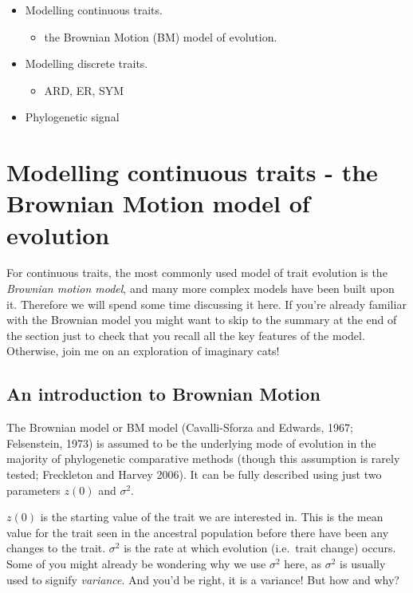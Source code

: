 \documentclass[]{book}
\providecommand{\tightlist}{%
  \setlength{\itemsep}{0pt}\setlength{\parskip}{0pt}}
\begin{document}
\begin{itemize}
\tightlist
\item
  Modelling continuous traits.

  \begin{itemize}
  \tightlist
  \item
    the Brownian Motion (BM) model of evolution.
  \end{itemize}
\item
  Modelling discrete traits.

  \begin{itemize}
  \tightlist
  \item
    ARD, ER, SYM
  \end{itemize}
\item
  Phylogenetic signal
\end{itemize}

\section{Modelling continuous traits - the Brownian Motion model of
evolution}\label{modelling-continuous-traits---the-brownian-motion-model-of-evolution}

For continuous traits, the most commonly used model of trait evolution
is the \emph{Brownian motion model}, and many more complex models have
been built upon it. Therefore we will spend some time discussing it
here. If you're already familiar with the Brownian model you might want
to skip to the summary at the end of the section just to check that you
recall all the key features of the model. Otherwise, join me on an
exploration of imaginary cats!

\subsection{An introduction to Brownian
Motion}\label{an-introduction-to-brownian-motion}

The Brownian model or BM model (Cavalli-Sforza and Edwards, 1967;
Felsenstein, 1973) is assumed to be the underlying mode of evolution in
the majority of phylogenetic comparative methods (though this assumption
is rarely tested; Freckleton and Harvey 2006). It can be fully described
using just two parameters \(z(0)\) and \(\sigma^2\).

\(z(0)\) is the starting value of the trait we are interested in. This
is the mean value for the trait seen in the ancestral population before
there have been any changes to the trait. \(\sigma^2\) is the rate at
which evolution (i.e.~trait change) occurs. Some of you might already be
wondering why we use \(\sigma^2\) here, as \(\sigma^2\) is usually used
to signify \emph{variance}. And you'd be right, it is a variance! But
how and why?
\end{document}
